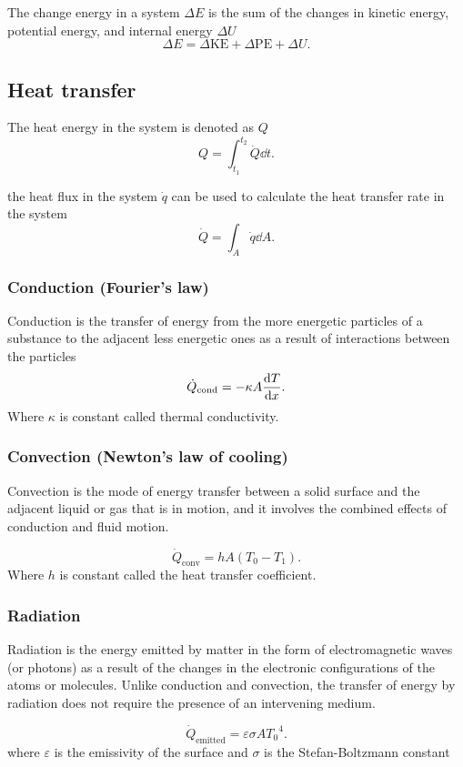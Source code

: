 \documentclass{report}
\begin{document}
The change energy in a system $\Delta E$ is the sum of the changes in kinetic energy, potential energy, and internal energy $\Delta U$
\[
	\Delta E = \Delta\text{KE} + \Delta\text{PE} + \Delta U
	.\]

\subsection{Heat transfer}

The heat energy in the system is denoted as $Q$
\[
	Q = \int_{t_1}^{t_2}\dot{Q}\dd{t}
	.\]

the heat flux in the system $\dot{q}$ can be used to calculate the heat transfer rate in the system
\[
	\dot{Q} = \int_A \dot{q}\dd{A}
	.\]

\subsubsection{Conduction (Fourier’s law)}

Conduction is the transfer of energy from the more energetic particles of a substance to the adjacent less energetic ones as a result of interactions between the particles
\[
	\dot{Q}_\text{cond} =-\kappa A \dv{T}{x}
	.\]
Where $\kappa$ is constant called thermal conductivity.

\subsubsection{Convection (Newton’s law of cooling)}
Convection is the mode of energy transfer between a solid surface and the adjacent liquid or gas that is in motion, and it involves the combined effects of conduction and fluid motion.

\[
	\dot{Q}_\text{conv} = hA(T_0-T_1)
	.\]
Where $h$ is constant called the heat transfer coefficient.

\subsubsection{Radiation}
Radiation is the energy emitted by matter in the form of electromagnetic waves (or photons) as a result of the changes in the electronic configurations of the atoms or molecules. Unlike conduction and convection, the transfer of energy by radiation does not require the presence of an intervening medium.

\[
	\dot{Q}_\text{emitted} = \varepsilon\sigma A{T_0}^4
	.\]
where $\varepsilon$ is the emissivity of the surface and $\sigma$ is the Stefan-Boltzmann constant
\end{document}
